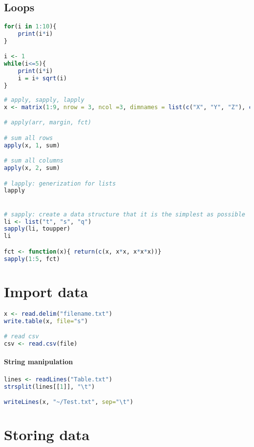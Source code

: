 \documentclass[11pt]{article}
\begin{document}
\subsection{Loops} %
\label{sub:loops}
\begin{lstlisting}[language=R]
for(i in 1:10){
	print(i*i)
}

i <- 1
while(i<=5){
	print(i*i)
	i = i+ sqrt(i)
}
\end{lstlisting}


\begin{lstlisting}[language=R]
# apply, sapply, lapply
x <- matrix(1:9, nrow = 3, ncol =3, dimnames = list(c("X", "Y", "Z"), c("A", "B", "C")))

# apply(arr, margin, fct)

# sum all rows
apply(x, 1, sum)

# sum all columns 
apply(x, 2, sum)

# lapply: generization for lists
lapply


# sapply: create a data structure that it is the simplest as possible
li <- list("t", "s", "q")
sapply(li, toupper)
li

fct <- function(x){ return(c(x, x*x, x*x*x))}
sapply(1:5, fct)
\end{lstlisting}

\section{Import data} %
\label{sec:import_data}
\begin{lstlisting}[language=R]
x <- read.delim("filename.txt")
write.table(x, file="s")

# read csv
csv <- read.csv(file)
\end{lstlisting}

\paragraph{String manipulation} %
\label{par:string_manipulation}

\begin{lstlisting}[language=R]
lines <- readLines("Table.txt")
strsplit(lines[[1]], "\t")

writeLines(x, "~/Test.txt", sep="\t")
\end{lstlisting}

\section{Storing data} %
\label{sec:storing_data}
\end{document}
